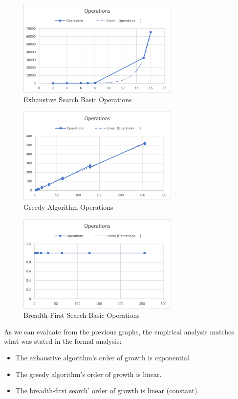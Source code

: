 \documentclass[]{revdetua}
\begin{document}
\begin{figure}[H]
    \centering
    \includegraphics[width=8cm]{Exhaustive Search/Operations.png}
    \caption{Exhaustive Search Basic Operations}
\end{figure}

\begin{figure}[H]
    \centering
    \includegraphics[width=8cm]{Greedy Algorithm/Operations.png}
    \caption{Greedy Algorithm Operations}
\end{figure}

\begin{figure}[H]
    \centering
    \includegraphics[width=8cm]{Breadth-First/Operations.png}
    \caption{Breadth-First Search Basic Operations}
\end{figure}

As we can evaluate from the previous graphs, the empirical analysis matches what was stated in the formal analysis:
\begin{itemize}
\item The exhaustive algorithm's order of growth is exponential.
\item The greedy algorithm's order of growth is linear.
\item The breadth-first search' order of growth is linear (constant).
\end{itemize}
\end{document}

